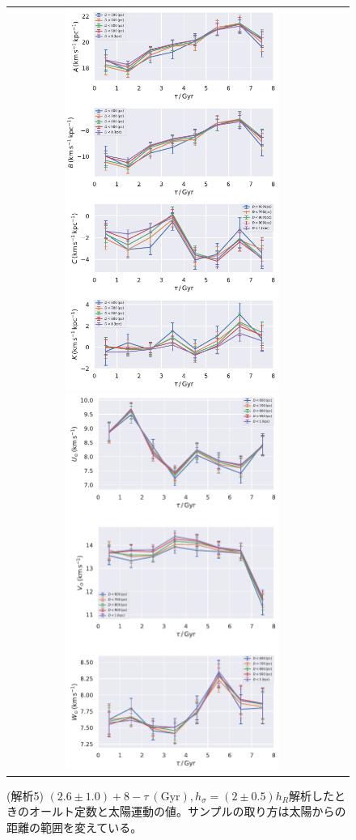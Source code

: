 \begin{figure}[htbp]
   \centering
\begin{tabular}{cc}
\includegraphics[width=7cm]{fig/ABCK_5.pdf}
\includegraphics[width=7cm]{fig/UVW_5.pdf}
\end{tabular}
    \caption{(解析5) $(2.6 \pm 1.0) + 8 - \tau\ (\mathrm{Gyr}), h_{\sigma} = (2\pm 0.5)h_R$解析したときのオールト定数と太陽運動の値。サンプルの取り方は太陽からの距離の範囲を変えている。}
    \label{figObs5}
\end{figure}

